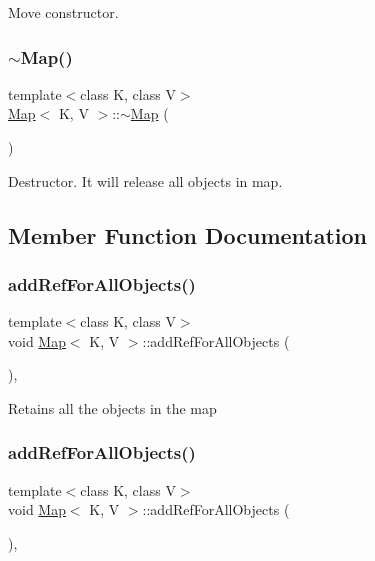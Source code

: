 Move constructor. \mbox{\label{classMap_a6d8939f2cc39bf1f49ac76e32822e96c}} 
\subsubsection{\texorpdfstring{$\sim$\+Map()}{~Map()}\hspace{0.1cm}{\footnotesize\ttfamily [2/2]}}
{\footnotesize\ttfamily template$<$class K, class V$>$ \\
\hyperlink{classMap}{Map}$<$ K, V $>$\+::$\sim$\hyperlink{classMap}{Map} (\begin{DoxyParamCaption}{ }\end{DoxyParamCaption})\hspace{0.3cm}{\ttfamily [inline]}}

Destructor. It will release all objects in map. 

\subsection{Member Function Documentation}
\mbox{\label{classMap_ac3937da982be4c236e3fdcb36cdf23f9}} 
\subsubsection{\texorpdfstring{add\+Ref\+For\+All\+Objects()}{addRefForAllObjects()}\hspace{0.1cm}{\footnotesize\ttfamily [1/2]}}
{\footnotesize\ttfamily template$<$class K, class V$>$ \\
void \hyperlink{classMap}{Map}$<$ K, V $>$\+::add\+Ref\+For\+All\+Objects (\begin{DoxyParamCaption}{ }\end{DoxyParamCaption})\hspace{0.3cm}{\ttfamily [inline]}, {\ttfamily [protected]}}

Retains all the objects in the map \mbox{\label{classMap_ac3937da982be4c236e3fdcb36cdf23f9}} 
\subsubsection{\texorpdfstring{add\+Ref\+For\+All\+Objects()}{addRefForAllObjects()}\hspace{0.1cm}{\footnotesize\ttfamily [2/2]}}
{\footnotesize\ttfamily template$<$class K, class V$>$ \\
void \hyperlink{classMap}{Map}$<$ K, V $>$\+::add\+Ref\+For\+All\+Objects (\begin{DoxyParamCaption}{ }\end{DoxyParamCaption})\hspace{0.3cm}{\ttfamily [inline]}, {\ttfamily [protected]}}

